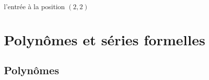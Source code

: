 \documentclass[12pt,a4paper]{book}
\makeatletter
\theoremstyle{definition}
\newcommand\extraspace{
	\vspace{0.25em}
}
\newcommand\whyprefix[2]{%
	\textbf{\prefix{#1}}-#2%
}
\newcommand\mwhyprefix[2]{%
	\texttt{#1 = #1-#2}%
}
\newcommand\prefix[1]{%
	\texttt{#1}%
}
\newcommand\inenglish{\@ifstar{\@inenglish@star}{\@inenglish@no@star}}
\newcommand\@inenglish@star[1]{%
	\emph{\og #1 \fg}%
}
\newcommand\@inenglish@no@star[1]{%
	\@inenglish@star{#1} en anglais%
}
\makeatother
\begin{document}
{{ l'entrée à la position $(2, 2)$                   








%
%
%
%
%
%
%
%
%
%
%
%
%
%
%
%
%
%
%
%
%
%
%
%
%
%
%
%
%
%
%
%


\section{Polynômes et séries formelles}

\subsection{Polynômes}



}}
\end{document}
